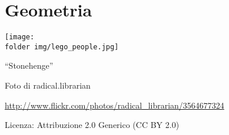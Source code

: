 
\part{Geometria}

\texttt{[image: \\folder img/lego\_people.jpg]}
  \begin{center}
    {\large ``Stonehenge''}\par
    Foto di radical.librarian\par
    \url{http://www.flickr.com/photos/radical_librarian/3564677324}\par
    Licenza: Attribuzione 2.0 Generico (CC BY 2.0)\par
  \end{center}
\clearpage
\cleardoublepage

